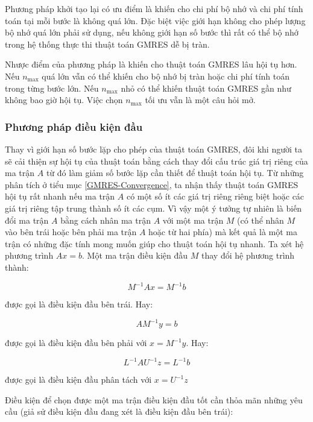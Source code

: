 \documentclass[14pt, a4paper]{article}
\numberwithin{equation}{section}
\numberwithin{algorithm}{section}
\numberwithin{figure}{section}
\numberwithin{dl}{section}
\numberwithin{md}{section}
\numberwithin{bd}{section}
\numberwithin{dn}{section}
\begin{document}
Phương pháp khởi tạo lại có ưu điểm là khiến cho chi phí bộ nhớ và chi phí tính toán tại mỗi bước là không quá lớn. Đặc biệt việc giới hạn không cho phép lượng bộ nhớ quá lớn phải sử dụng, nếu không giới hạn số bước thì rất có thể bộ nhớ trong hệ thống thực thi thuật toán GMRES dễ bị tràn.

Nhược điểm của phương pháp là khiến cho thuật toán GMRES lâu hội tụ hơn. Nếu $n_{\max}$ quá lớn vẫn có thể khiến cho bộ nhớ bị tràn hoặc chi phí tính toán trong từng bước lớn. Nếu $n_{\max}$ nhỏ có thể khiến thuật toán GMRES gần như không bao giờ hội tụ. Việc chọn $n_{\max}$ tối ưu vẫn là một câu hỏi mở.

\subsubsection{Phương pháp điều kiện đầu} \label{GMRES-Precondition}

Thay vì giới hạn số bước lặp cho phép của thuật toán GMRES, đôi khi người ta sẽ cải thiện sự hội tụ của thuật toán bằng cách thay đổi cấu trúc giá trị riêng của ma trận $A$ từ đó làm giảm số bước lặp cần thiết để thuật toán hội tụ.
Từ những phân tích ở tiểu mục \ref{GMRES-Convergence}, ta nhận thấy thuật toán GMRES hội tụ rất nhanh nếu ma trận $A$ có một số ít các giá trị riêng riêng biệt hoặc các giá trị riêng tập trung thành số ít các cụm. Vì vậy một ý tưởng tự nhiên là biến đổi ma trận $A$ bằng cách nhân ma trận $A$ với một ma trận $M$ (có thể nhân $M$ vào bên trái hoặc bên phải ma trận $A$ hoặc từ hai phía) mà kết quả là một ma trận có những đặc tính mong muốn giúp cho thuật toán hội tụ nhanh.
Ta xét hệ phương trình $Ax=b$. Một ma trận điều kiện đầu $M$ thay đổi hệ phương trình thành:

\begin{equation}
    M^{-1}Ax = M^{-1}b
\end{equation}

được gọi là điều kiện đầu bên trái. Hay:

\begin{equation}
    AM^{-1}y = b
\end{equation}

được gọi là điều kiện đầu bên phải với $x=M^{-1}y$. Hay:

\begin{equation}
    L^{-1}AU^{-1}z = L^{-1}b
\end{equation}

được gọi là điều kiện đầu phân tách với $x=U^{-1}z$

Điều kiện để chọn được một ma trận điều kiện đầu tốt cần thỏa mãn những yêu cầu (giả sử điều kiện đầu đang xét là điều kiện đầu bên trái):
\end{document}
